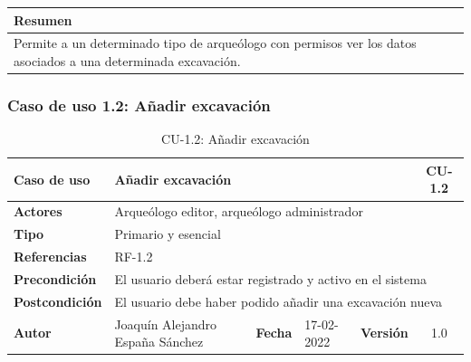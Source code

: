     \begin{table}[H]
        \centering
        \begin{tabularx}{\textwidth}{@{} |L |@{}} \hline
            \textbf{Resumen} \\
            \hline
            Permite a un determinado tipo de arqueólogo con permisos ver los datos asociados
            a una determinada excavación. \\
            \hline
        \end{tabularx}
    \end{table}

\subsubsection{Caso de uso 1.2: Añadir excavación}

\begin{table}[H]
    \begin{center}
        \begin{adjustbox}{width=\textwidth}
        \begin{tabular}{ | l | l | l | l | c | c | } 
            \hline
            \textbf{Caso de uso} & \multicolumn{4}{l|}{Añadir excavación} & \cellcolor{gray!50} \textbf{CU-1.2}\\
            \hline
            \textbf{Actores} & \multicolumn{5}{p{0.9\linewidth}|}{Arqueólogo editor, arqueólogo administrador } \\
            \hline
            \textbf{Tipo} & \multicolumn{5}{l|}{Primario y esencial} \\
            \hline
            \textbf{Referencias} & \multicolumn{3}{l|}{RF-1.2} & \multicolumn{2}{l|}{ }\\
            \hline
            \textbf{Precondición} & \multicolumn{5}{l|}{El usuario deberá estar registrado y activo en el sistema} \\
            \hline
            \textbf{Postcondición} & \multicolumn{5}{l|}{El usuario debe haber podido añadir una excavación nueva} \\
            \hline
            \textbf{Autor} & \multicolumn{1}{p{0.25\linewidth}|}{Joaquín Alejandro España Sánchez} & \textbf{Fecha} & 
            17-02-2022     & \textbf{Versión}                                                      & 1.0\\
            \hline
        \end{tabular}
        \end{adjustbox}
        \caption{CU-1.2: Añadir excavación}
        \label{tab:add-excavation}
    \end{center}
    \end{table}

